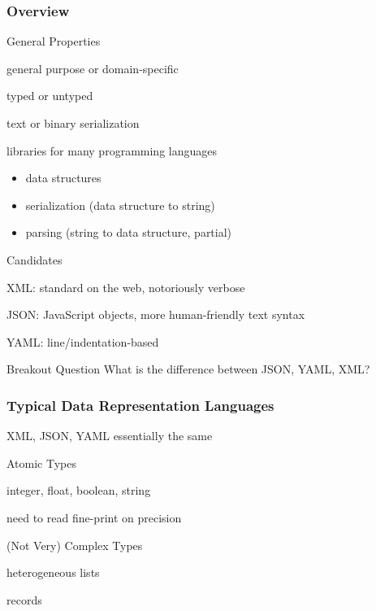\documentclass{beamer}
\begin{document}
\begin{frame}\frametitle{Overview}
\begin{blockitems}{General Properties}
 \item general purpose or domain-specific
 \item typed or untyped
 \item text or binary serialization
 \item libraries for many programming languages
  \begin{itemize}
  \item data structures
  \item serialization (data structure to string)
  \item parsing (string to data structure, partial)
  \end{itemize}
\end{blockitems}

\begin{blockitems}{Candidates}
 \item XML: standard on the web, notoriously verbose
 \item JSON: JavaScript objects, more human-friendly text syntax
 \item YAML: line/indentation-based
\end{blockitems}
\end{frame}

\begin{frame}{Breakout Question}
What is the difference between JSON, YAML, XML?
\end{frame}

\begin{frame}\frametitle{Typical Data Representation Languages}
XML, JSON, YAML essentially the same

\begin{blockitems}{Atomic Types}
 \item integer, float, boolean, string
 \item need to read fine-print on precision
\end{blockitems}
 
\begin{blockitems}{(Not Very) Complex Types}
 \item heterogeneous lists
 \item records
\end{blockitems}
\end{frame}
\end{document}
